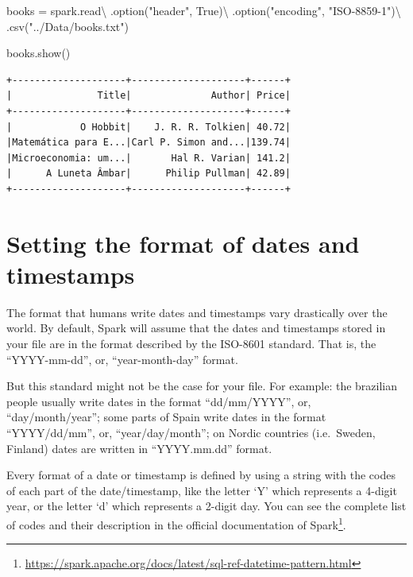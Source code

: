 \documentclass[
  11pt,
  letterpaper,
  DIV=11,
  numbers=noendperiod]{scrreprt}
\newenvironment{Shaded}{\begin{snugshade}}{\end{snugshade}}
\newcommand{\NormalTok}[1]{\textcolor[rgb]{0.00,0.23,0.31}{#1}}
\newcommand{\OperatorTok}[1]{\textcolor[rgb]{0.37,0.37,0.37}{#1}}
\newcommand{\StringTok}[1]{\textcolor[rgb]{0.13,0.47,0.30}{#1}}
\newcommand{\VariableTok}[1]{\textcolor[rgb]{0.07,0.07,0.07}{#1}}
\begin{document}
\begin{Shaded}
\begin{Highlighting}[]
\NormalTok{books }\OperatorTok{=}\NormalTok{ spark.read}\OperatorTok{\textbackslash{}}
\NormalTok{  .option(}\StringTok{"header"}\NormalTok{, }\VariableTok{True}\NormalTok{)}\OperatorTok{\textbackslash{}}
\NormalTok{  .option(}\StringTok{"encoding"}\NormalTok{, }\StringTok{"ISO{-}8859{-}1"}\NormalTok{)}\OperatorTok{\textbackslash{}}
\NormalTok{  .csv(}\StringTok{"../Data/books.txt"}\NormalTok{)}
  
\NormalTok{books.show()}
\end{Highlighting}
\end{Shaded}

\begin{verbatim}
+--------------------+--------------------+------+
|               Title|              Author| Price|
+--------------------+--------------------+------+
|            O Hobbit|    J. R. R. Tolkien| 40.72|
|Matemática para E...|Carl P. Simon and...|139.74|
|Microeconomia: um...|       Hal R. Varian| 141.2|
|      A Luneta Âmbar|      Philip Pullman| 42.89|
+--------------------+--------------------+------+
\end{verbatim}

\hypertarget{setting-the-format-of-dates-and-timestamps}{%
\section{Setting the format of dates and
timestamps}\label{setting-the-format-of-dates-and-timestamps}}

The format that humans write dates and timestamps vary drastically over
the world. By default, Spark will assume that the dates and timestamps
stored in your file are in the format described by the ISO-8601
standard. That is, the ``YYYY-mm-dd'', or, ``year-month-day'' format.

But this standard might not be the case for your file. For example: the
brazilian people usually write dates in the format ``dd/mm/YYYY'', or,
``day/month/year''; some parts of Spain write dates in the format
``YYYY/dd/mm'', or, ``year/day/month''; on Nordic countries
(i.e.~Sweden, Finland) dates are written in ``YYYY.mm.dd'' format.

Every format of a date or timestamp is defined by using a string with
the codes of each part of the date/timestamp, like the letter `Y' which
represents a 4-digit year, or the letter `d' which represents a 2-digit
day. You can see the complete list of codes and their description in the
official documentation of Spark\footnote{\url{https://spark.apache.org/docs/latest/sql-ref-datetime-pattern.html}}.
\end{document}

